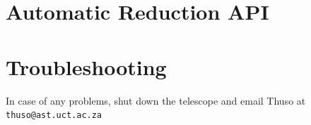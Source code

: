 \documentclass[12pt,twoside,a4paper]{report}
\begin{document}

\chapter{Automatic Reduction API}
\label{autoapi}




\chapter{Troubleshooting}
In case of any problems, shut down the telescope and email Thuso at {\tt thuso@ast.uct.ac.za}

\end{document}
